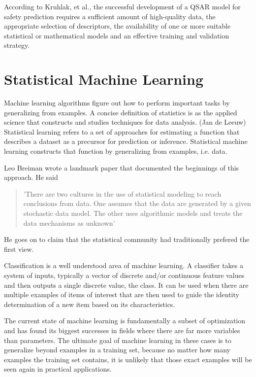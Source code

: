 According to Kruhlak, et al., the successful development of a QSAR model for safety prediction requires a sufficient amount of high-quality data, the appropriate selection of descriptors, the availability of one or more suitable statistical or mathematical models and an effective training and validation strategy.
\cite{Kruhlak2012}

\section{Statistical Machine Learning}

Machine learning algorithms figure out how to perform important tasks by generalizing from examples. A concise definition of statistics is as the applied science that constructs and studies techniques for data analysis. (Jan de Leeuw) Statistical learning refers to a set of approaches for estimating a function that describes a dataset as a precursor for prediction or inference. \cite{James2013} Statistical machine learning constructs that function by generalizing from examples, i.e. data.

Leo Breiman wrote a landmark paper that documented the beginnings of this approach. He said 
\begin{quote}
'There are two cultures in the use of statistical modeling to reach conclusions from data. One assumes that the data are generated by a given stochastic data model. The other uses algorithmic models and treats the data mechanisms as unknown' \cite{Breiman2001}
\end{quote} He goes on to claim that the statistical community had traditionally prefered the first view.

Classification is a well understood area of machine learning. A classifier takes a system of inputs, typically a vector of discrete and/or continuous feature values and then outputs a single discrete value, the class. \cite{Domingos2012} It can be used when there are multiple examples of items of interest that are then used to guide the identity determination of a new item based on its characteristics.

The current state of machine learning is fundamentally a subset of optimization and has found its biggest successes in fields where there are far more variables than parameters. The ultimate goal of machine learning in these cases is to generalize beyond examples in a training set, because no matter how many examples the training set contains, it is unlikely that those exact examples will be seen again in practical applications. \cite{Domingos2012} 

